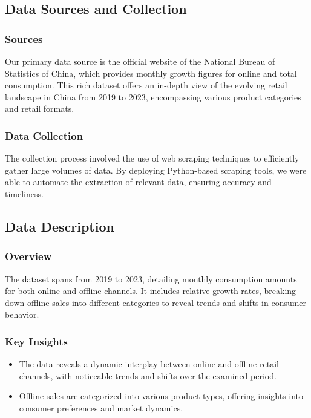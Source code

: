 \documentclass{article}
\begin{document}
\subsection*{Data Sources and Collection}

\subsubsection*{Sources}
Our primary data source is the official website of the National Bureau of Statistics of China, which provides monthly growth figures for online and total consumption. This rich dataset offers an in-depth view of the evolving retail landscape in China from 2019 to 2023, encompassing various product categories and retail formats.

\subsubsection*{Data Collection}
The collection process involved the use of web scraping techniques to efficiently gather large volumes of data. By deploying Python-based scraping tools, we were able to automate the extraction of relevant data, ensuring accuracy and timeliness.

\subsection*{Data Description}

\subsubsection*{Overview}
The dataset spans from 2019 to 2023, detailing monthly consumption amounts for both online and offline channels. It includes relative growth rates, breaking down offline sales into different categories to reveal trends and shifts in consumer behavior.

\subsubsection*{Key Insights}
\begin{itemize}
    \item The data reveals a dynamic interplay between online and offline retail channels, with noticeable trends and shifts over the examined period.
    \item Offline sales are categorized into various product types, offering insights into consumer preferences and market dynamics.
\end{itemize}
\end{document}
